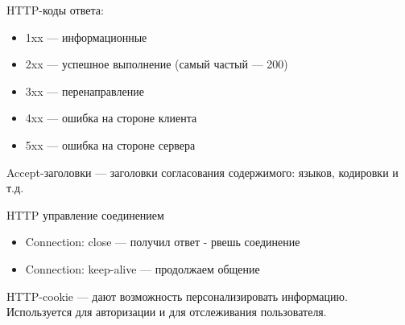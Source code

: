 \documentclass{article}
\begin{document}
HTTP-коды ответа:
\begin{itemize}
	\item 1xx --- информационные
	\item 2xx --- успешное выполнение (самый частый --- 200)
	\item 3xx --- перенаправление
	\item 4xx --- ошибка на стороне клиента
	\item 5xx --- ошибка на стороне сервера
\end{itemize}

Accept-заголовки --- заголовки согласования содержимого: языков, кодировки и т.д.

HTTP управление соединением
\begin{itemize}
	\item Connection: close --- получил ответ - рвешь соединение
	\item Connection: keep-alive --- продолжаем общение
\end{itemize}

HTTP-cookie --- дают возможность персонализировать информацию. Используется для авторизации и для отслеживания пользователя.
\end{document}
